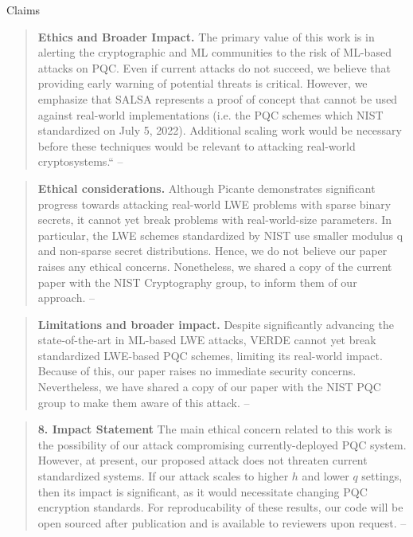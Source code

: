 \documentclass[xcolor=table,10pt,aspectratio=169]{beamer}
\begin{document}
\begin{frame}[allowframebreaks]{Claims}
\begin{quote}
\textbf{Ethics and Broader Impact.} The primary value of this work is in alerting the cryptographic and ML communities to the risk of ML-based attacks on PQC. Even if current attacks do not succeed, we believe that \alert{providing early warning of potential threats is critical}. However, we emphasize that SALSA represents a proof of concept that cannot be used against real-world implementations (i.e. the PQC schemes which NIST standardized on July 5, 2022). Additional scaling work would be necessary before these techniques would be relevant to attacking real-world cryptosystems.`` -- \cite{NeurIPS:WCCL22}
\end{quote}

\framebreak

\begin{quote}
\textbf{Ethical considerations.} Although Picante demonstrates significant progress towards attacking real-world LWE problems with sparse binary secrets, \alert{it cannot yet break} problems with real-world-size parameters. In particular, the LWE schemes standardized by NIST use smaller modulus q and non-sparse secret distributions. Hence, we do not believe our paper raises any ethical concerns. Nonetheless, we shared a copy of the current paper with the NIST Cryptography group, to inform them of our approach. --  \cite{CCS:LSWMGCL23}
\end{quote}

\framebreak

\begin{quote}
\textbf{Limitations and broader impact.} Despite significantly advancing the state-of-the-art in ML-based
LWE attacks, VERDE \alert{cannot yet break} standardized LWE-based PQC schemes, limiting its real-world
impact. Because of this, our paper raises no immediate security concerns. Nevertheless, we have
shared a copy of our paper with the NIST PQC group to make them aware of this attack. -- \cite{EPRINT:LSWACL23}
\end{quote}

\framebreak

\begin{quote}
\textbf{8. Impact Statement} The main ethical concern related to this work is the possibility of our attack compromising currently-deployed PQC system. However, \alert{at present, our proposed attack does not threaten current standardized systems}. If our attack scales to higher \(h\) and lower \(q\) settings, then its impact is significant, as it would necessitate changing PQC encryption standards. For reproducability of these results, our code will be open sourced after publication and is available to reviewers upon request. -- \cite{EPRINT:SWLNSCL24} 
\end{quote}
\end{frame}
\end{document}
